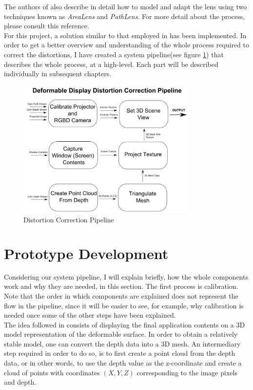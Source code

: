 \documentclass[]{article}
\begin{document}
The authors of \cite{pindat12} also describe in detail how to model and adapt the lens using two techniques known as \textit{AreaLens} and \textit{PathLens}. For more detail about the process, please consult this reference.\\

For this project, a solution similar to that employed in \cite{watanabe08} has been implemented. In order to get a better overview and understanding of the whole process required to correct the distortions, I have created a system pipeline(see figure \ref{fig:Pipeline}) that describes the whole process, at a high-level. Each part will be described individually in subsequent chapters.

\begin{figure}[hbtp]
    \centering
    \includegraphics[width=0.8\textwidth]{figures/DeformableDisplayPipeline.PNG}
    \caption{Distortion Correction Pipeline}
    \label{fig:Pipeline}
\end{figure}
\newpage
\section{Prototype Development}

Considering our system pipeline, I will explain briefly, how the whole components work and why they are needed, in this section. The first process is calibration. Note that the order in which components are explained does not represent the flow in the pipeline, since it will be easier to see, for example, why calibration is needed once some of the other steps have been explained.\\

The idea followed in \cite{watanabe08} consists of displaying the final application contents on a 3D model representation of the deformable surface. In order to obtain a relatively stable model, one can convert the depth data into a 3D mesh. An intermediary step required in order to do so, is to first create a point cloud from the depth data, or in other words, to use the depth value as the z-coordinate and create a cloud of points with coordinates $(X, Y, Z)$ corresponding to the image pixels and depth.\\
\end{document}
